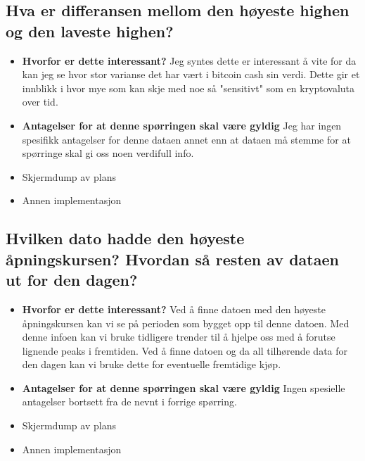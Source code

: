 \documentclass{article}
\begin{document}
    \subsection{Hva er differansen mellom den høyeste highen og den laveste highen?}

    \begin{itemize}
        
   
    \item \textbf{Hvorfor er dette interessant?} \newline
    Jeg syntes dette er interessant å vite for da kan jeg se hvor stor varianse det har vært i bitcoin cash sin verdi. 
    Dette gir et innblikk i hvor mye som kan skje med noe så "sensitivt" som en kryptovaluta over tid.
    \item \textbf{Antagelser for at denne spørringen skal være gyldig} \newline
    Jeg har ingen spesifikk antagelser for denne dataen annet enn at dataen må stemme for at spørringe skal gi oss noen verdifull info.
    \item Skjermdump av plans
    
    \item Annen implementasjon

    \end{itemize}

    \subsection{Hvilken dato hadde den høyeste åpningskursen? Hvordan så resten av dataen ut for den dagen?}
    \begin{itemize}
        
    \item \textbf{Hvorfor er dette interessant?} \newline
    Ved å finne datoen med den høyeste åpningskursen kan vi se på perioden som bygget opp til denne datoen. Med denne infoen kan vi bruke tidligere trender til å hjelpe oss med å forutse lignende peaks i fremtiden. Ved å finne datoen og da all tilhørende data for den dagen kan vi bruke dette for eventuelle fremtidige kjøp.
    \item \textbf{Antagelser for at denne spørringen skal være gyldig} \newline
    Ingen spesielle antagelser bortsett fra de nevnt i forrige spørring.
    \item Skjermdump av plans
    
    \item Annen implementasjon

    \end{itemize}
\end{document}
